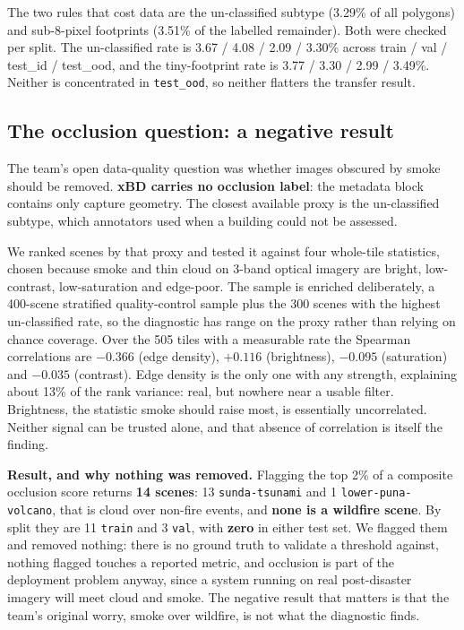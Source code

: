 \documentclass[10pt,twocolumn]{article}
\newcommand{\keybox}[2]{%
  \begin{center}
  \setlength{\fboxsep}{8pt}%
  \colorbox{#1}{\begin{minipage}{0.90\columnwidth}\small #2\end{minipage}}%
  \end{center}}
\newcommand{\class}[1]{\textsf{#1}}
\begin{document}
The two rules that cost data are the \class{un-classified} subtype (3.29\% of all polygons) and
sub-8-pixel footprints (3.51\% of the labelled remainder). Both were checked per split. The
\class{un-classified} rate is 3.67 / 4.08 / 2.09 / 3.30\% across
train / val / test\_id / test\_ood, and the tiny-footprint rate is 3.77 / 3.30 / 2.99 / 3.49\%.
Neither is concentrated in \texttt{test\_ood}, so neither flatters the transfer result.

\subsection{The occlusion question: a negative result}

The team's open data-quality question was whether images obscured by smoke should be removed.
\textbf{xBD carries no occlusion label}: the metadata block contains only capture geometry. The
closest available proxy is the \class{un-classified} subtype, which annotators used when a building
could not be assessed.

We ranked scenes by that proxy and tested it against four whole-tile statistics, chosen because
smoke and thin cloud on 3-band optical imagery are bright, low-contrast, low-saturation and
edge-poor. The sample is enriched deliberately, a 400-scene stratified quality-control sample plus
the 300 scenes with the highest \class{un-classified} rate, so the diagnostic has range on the proxy
rather than relying on chance coverage. Over the 505 tiles with a measurable rate the Spearman
correlations are $-0.366$ (edge density), $+0.116$ (brightness), $-0.095$ (saturation) and $-0.035$
(contrast). Edge density is the only one with any strength, explaining about 13\% of the rank
variance: real, but nowhere near a usable filter. Brightness, the statistic smoke should raise most,
is essentially uncorrelated. Neither signal can be trusted alone, and that absence of correlation is
itself the finding.

\keybox{accentbg}{
\textbf{Result, and why nothing was removed.} Flagging the top 2\% of a composite occlusion score
returns \textbf{14 scenes}: 13 \texttt{sunda-tsunami} and 1 \texttt{lower-\allowbreak puna-volcano}, that is
cloud over non-fire events, and \textbf{none is a wildfire scene}. By split they are 11
\texttt{train} and 3 \texttt{val}, with \textbf{zero} in either test set. We flagged them and removed
nothing: there is no ground truth to validate a threshold against, nothing flagged touches a reported
metric, and occlusion is part of the deployment problem anyway, since a system running on real
post-disaster imagery will meet cloud and smoke. The negative result that matters is that the team's
original worry, smoke over wildfire, is not what the diagnostic finds.}
\end{document}
